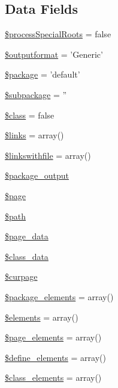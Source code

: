 \subsection*{\-Data \-Fields}
\begin{DoxyCompactItemize}
\item 
\hyperlink{class_converter_adcae2bdef17468fc5bf2f15981da497e}{\$process\-Special\-Roots} = false
\item 
\hyperlink{class_converter_af0bfe153c049d957e8ea29b147025108}{\$outputformat} = '\-Generic'
\item 
\hyperlink{class_converter_a365395516cc195292e97e09bc0d165ae}{\$package} = 'default'
\item 
\hyperlink{class_converter_ac601dc8dc2a086b6381128cc9c7a3fc5}{\$subpackage} = ''
\item 
\hyperlink{class_converter_a252ba022809910ea710a068fc1bab657}{\$class} = false
\item 
\hyperlink{class_converter_a4ca8be3ff3cf95aa3af546449c1f1bec}{\$links} = array()
\item 
\hyperlink{class_converter_a89c203d50b13055a05a27bd0baf34a8d}{\$linkswithfile} = array()
\item 
\hyperlink{class_converter_a3e4a95e63781fd6b62f454f84c41c3ae}{\$package\-\_\-output}
\item 
\hyperlink{class_converter_a0a44e6760141442bb439b1ab1395d8ff}{\$page}
\item 
\hyperlink{class_converter_a0a4baf0b22973c07685c3981f0d17fc4}{\$path}
\item 
\hyperlink{class_converter_a22fa57ada47299e1b00ca90f550a1194}{\$page\-\_\-data}
\item 
\hyperlink{class_converter_afdb3770ba45b6d4db2c00c8c18832482}{\$class\-\_\-data}
\item 
\hyperlink{class_converter_a3953bad97628e903e2f403e75f3ce43b}{\$curpage}
\item 
\hyperlink{class_converter_a77214bc65f8fe29915139fe0b0044a53}{\$package\-\_\-elements} = array()
\item 
\hyperlink{class_converter_ad18dd8fbe31b294e2bc4711dcde4548d}{\$elements} = array()
\item 
\hyperlink{class_converter_a5dc95f781b9a381af6fb199035074f47}{\$page\-\_\-elements} = array()
\item 
\hyperlink{class_converter_a46eda50e152d92d75da1cae8c8a3652c}{\$define\-\_\-elements} = array()
\item 
\hyperlink{class_converter_a82c1ed609548471e99d13d57cefef0bf}{\$class\-\_\-elements} = array()

\end{DoxyCompactItemize}
